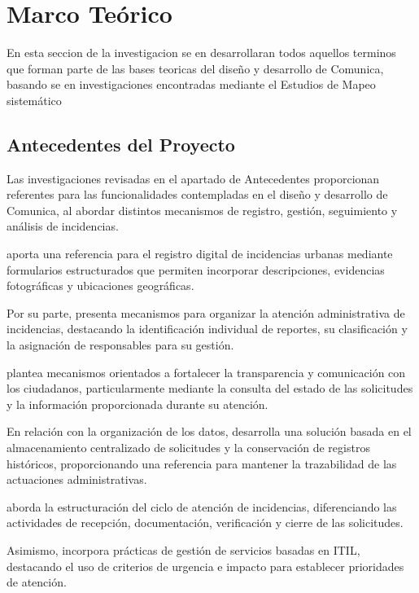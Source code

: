 \section{Marco Teórico}
\label{subsec:marco_teorico}
En esta seccion de la investigacion se en desarrollaran todos aquellos terminos que forman parte de las bases teoricas del diseño y desarrollo de Comunica, basando se en investigaciones encontradas mediante el Estudios de Mapeo sistemático \cite{petersen2008systematic}

\subsection{Antecedentes del Proyecto}
Las investigaciones revisadas en el apartado de Antecedentes proporcionan referentes para las funcionalidades contempladas en el diseño y desarrollo de Comunica, al abordar distintos mecanismos de registro, gestión, seguimiento y análisis de incidencias.

\textcite{parrales2025desarrollo} aporta una referencia para el registro digital de incidencias urbanas mediante formularios estructurados que permiten incorporar descripciones, evidencias fotográficas y ubicaciones geográficas.

Por su parte, \textcite{trejo2019sistema} presenta mecanismos para organizar la atención administrativa de incidencias, destacando la identificación individual de reportes, su clasificación y la asignación de responsables para su gestión.

\textcite{murillo2025aplicacion} plantea mecanismos orientados a fortalecer la transparencia y comunicación con los ciudadanos, particularmente mediante la consulta del estado de las solicitudes y la información proporcionada durante su atención.

En relación con la organización de los datos, \textcite{moreno2026diseno} desarrolla una solución basada en el almacenamiento centralizado de solicitudes y la conservación de registros históricos, proporcionando una referencia para mantener la trazabilidad de las actuaciones administrativas.

\textcite{noriegasistema} aborda la estructuración del ciclo de atención de incidencias, diferenciando las actividades de recepción, documentación, verificación y cierre de las solicitudes.

Asimismo, \textcite{soel2024aplicacion} incorpora prácticas de gestión de servicios basadas en ITIL, destacando el uso de criterios de urgencia e impacto para establecer prioridades de atención.

